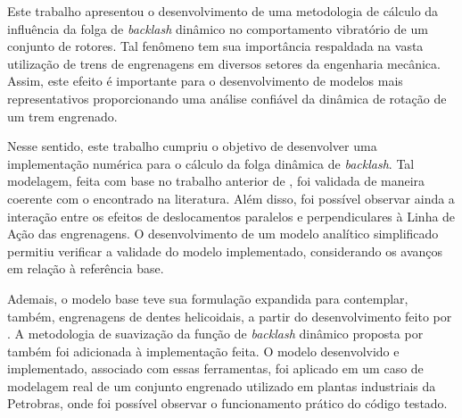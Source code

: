 Este trabalho apresentou o desenvolvimento de uma metodologia de cálculo da influência da folga de \textit{backlash} dinâmico no comportamento vibratório de um conjunto de rotores. Tal fenômeno tem sua importância respaldada na vasta utilização de trens de engrenagens em diversos setores da engenharia mecânica. 
Assim, este efeito é importante para o desenvolvimento de modelos mais representativos proporcionando uma análise confiável da dinâmica de rotação de um trem engrenado.

Nesse sentido, este trabalho cumpriu o objetivo de desenvolver uma implementação numérica para o cálculo da folga dinâmica de \textit{backlash}. Tal modelagem, feita com base no trabalho anterior de , foi validada de maneira coerente com o encontrado na literatura. Além disso, foi possível observar ainda a interação entre os efeitos de deslocamentos paralelos e perpendiculares à Linha de Ação das engrenagens. O desenvolvimento de um modelo analítico simplificado permitiu verificar a validade do modelo implementado, considerando os avanços em relação à referência base.

Ademais, o modelo base teve sua formulação expandida para contemplar, também, engrenagens de dentes helicoidais, a partir do desenvolvimento feito por . A metodologia de suavização da função de \textit{backlash} dinâmico proposta por  também foi adicionada à implementação feita. O modelo desenvolvido e implementado, associado com essas ferramentas, foi aplicado em um caso de modelagem real de um conjunto engrenado utilizado em plantas industriais da Petrobras, onde foi possível observar o funcionamento prático do código testado.


